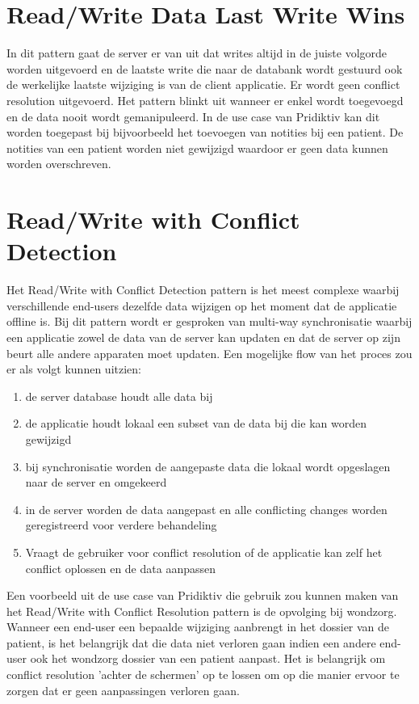 \section{Read/Write Data Last Write Wins}
In dit pattern gaat de server er van uit dat writes altijd in de juiste volgorde worden uitgevoerd en de laatste write die naar de databank wordt gestuurd ook de werkelijke laatste wijziging is van de client applicatie. Er wordt geen conflict resolution uitgevoerd. Het pattern blinkt uit wanneer er enkel wordt toegevoegd en de data nooit wordt gemanipuleerd. In de use case van Pridiktiv kan dit worden toegepast bij bijvoorbeeld het toevoegen van notities bij een patient. De notities van een patient worden niet gewijzigd waardoor er geen data kunnen worden overschreven.
\section{Read/Write with Conflict Detection}
Het Read/Write with Conflict Detection pattern is het meest complexe waarbij verschillende end-users dezelfde data wijzigen op het moment dat de applicatie offline is. Bij dit pattern wordt er gesproken van multi-way synchronisatie waarbij een applicatie zowel de data van de server kan updaten en dat de server op zijn beurt alle andere apparaten moet updaten. Een mogelijke flow van het proces zou er als volgt kunnen uitzien:
\begin{enumerate}
\item de server database houdt alle data bij
\item de applicatie houdt lokaal een subset van de data bij die kan worden gewijzigd
\item bij synchronisatie worden de aangepaste data die lokaal wordt opgeslagen naar de server en omgekeerd
\item in de server worden de data aangepast en alle conflicting changes worden geregistreerd voor verdere behandeling
\item Vraagt de gebruiker voor conflict resolution of de applicatie kan zelf het conflict oplossen en de data aanpassen
\end{enumerate}
Een voorbeeld uit de use case van Pridiktiv die gebruik zou kunnen maken van het Read/Write with Conflict Resolution pattern is de opvolging bij wondzorg. Wanneer een end-user een bepaalde wijziging aanbrengt in het dossier van de patient, is het belangrijk dat die data niet verloren gaan indien een andere end-user ook het wondzorg dossier van een patient aanpast. Het is belangrijk om conflict resolution 'achter de schermen' op te lossen om op die manier ervoor te zorgen dat er geen aanpassingen verloren gaan.

